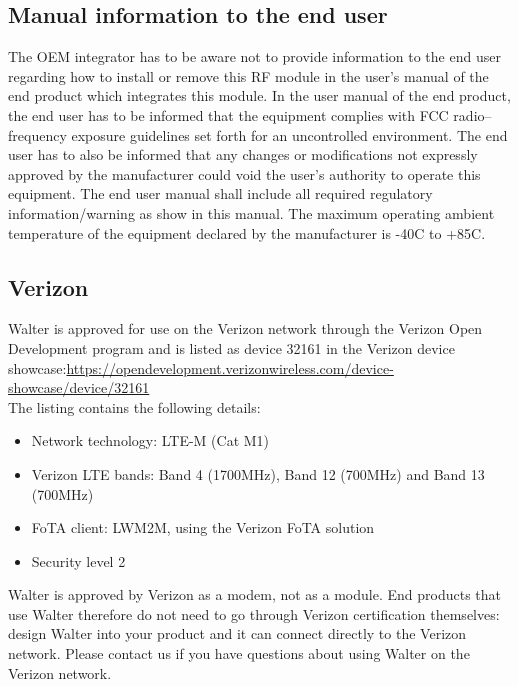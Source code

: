 \documentclass[11pt]{article}
\begin{document}
\subsection{Manual information to the end user}
The OEM integrator has to be aware not to provide information to the end user regarding how to install or remove this RF module in the user’s manual of the end product which integrates this module. In the user manual of the end product, the end user has to be informed that the equipment complies with FCC radio–frequency exposure guidelines set forth for an uncontrolled environment. The end user has to also be informed that any changes or modifications not expressly approved by the manufacturer could void the user’s authority to operate this equipment. The end user manual shall include all required regulatory information/warning as show in this manual. The maximum operating ambient temperature of the equipment declared by the manufacturer is -40\textdegree C to +85\textdegree C.

\subsection{Verizon} \label{verizon}
Walter is approved for use on the Verizon network through the Verizon Open Development program and is listed as device 32161 in the Verizon device showcase:\newline \url{https://opendevelopment.verizonwireless.com/device-showcase/device/32161}\\

The listing contains the following details:
\begin{itemize}
	\item Network technology: LTE-M (Cat M1)
	\item Verizon LTE bands: Band 4 (1700MHz), Band 12 (700MHz) and Band 13 (700MHz)
	\item FoTA client: LWM2M, using the Verizon FoTA solution
	\item Security level 2
\end{itemize}
Walter is approved by Verizon as a modem, not as a module. End products that use Walter therefore do not need to go through Verizon certification themselves: design Walter into your product and it can connect directly to the Verizon network. Please contact us if you have questions about using Walter on the Verizon network.
\end{document}
